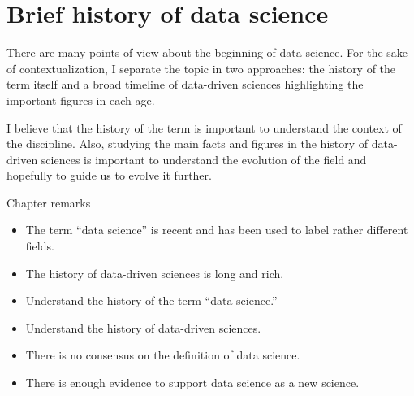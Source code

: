 \chapter{Brief history of data science}
\label{chap:history}


There are many points-of-view about the beginning of data science.  For the sake of
contextualization, I separate the topic in two approaches: the history of the term itself
and a broad timeline of data-driven sciences highlighting the important figures in each
age.

I believe that the history of the term is important to understand the context of the
discipline.  Also, studying the main facts and figures in the history of data-driven
sciences is important to understand the evolution of the field and hopefully to guide us
to evolve it further.

\begin{mainbox}{Chapter remarks}

  \begin{itemize}
    \item The term ``data science'' is recent and has been used to label rather different fields.
    \item The history of data-driven sciences is long and rich.
  \end{itemize}


  \begin{itemize}
    \item Understand the history of the term ``data science.''
    \item Understand the history of data-driven sciences.
  \end{itemize}


  \begin{itemize}
    \item There is no consensus on the definition of data science.
    \item There is enough evidence to support data science as a new science.
  \end{itemize}
\end{mainbox}

